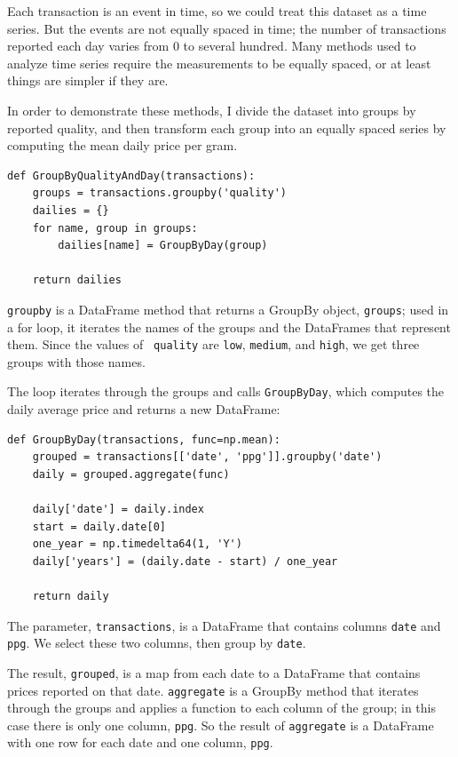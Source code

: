 \documentclass[12pt]{book}
\theoremstyle{exercise}
\begin{document}
Each transaction is an event in time, so we could treat this dataset
as a time series.  But the events are not equally spaced in time; the
number of transactions reported each day varies from 0 to several
hundred.  Many methods used to analyze time series require the
measurements to be equally spaced, or at least things are simpler if
they are.%
%

In order to demonstrate these methods, I divide the dataset
into groups by reported quality, and then transform each group into
an equally spaced series by computing the mean daily price per gram.

\begin{verbatim}
def GroupByQualityAndDay(transactions):
    groups = transactions.groupby('quality')
    dailies = {}
    for name, group in groups:
        dailies[name] = GroupByDay(group)        

    return dailies
\end{verbatim}

{\tt groupby} is a DataFrame method that returns a GroupBy object,
{\tt groups}; used in a for loop, it iterates the names of the groups
and the DataFrames that represent them.  Since the values of {\tt
  quality} are {\tt low}, {\tt medium}, and {\tt high}, we get three
groups with those names.%
%

The loop iterates through the groups and calls {\tt GroupByDay},
which computes the daily average price and returns a new DataFrame:

\begin{verbatim}
def GroupByDay(transactions, func=np.mean):
    grouped = transactions[['date', 'ppg']].groupby('date')
    daily = grouped.aggregate(func)

    daily['date'] = daily.index
    start = daily.date[0]
    one_year = np.timedelta64(1, 'Y')
    daily['years'] = (daily.date - start) / one_year

    return daily
\end{verbatim}

The parameter, {\tt transactions}, is a DataFrame that contains
columns {\tt date} and {\tt ppg}.  We select these two
columns, then group by {\tt date}.%

The result, {\tt grouped}, is a map from each date to a DataFrame that
contains prices reported on that date.  {\tt aggregate} is a
GroupBy method that iterates through the groups and applies a
function to each column of the group; in this case there is only one
column, {\tt ppg}.  So the result of {\tt aggregate} is a DataFrame
with one row for each date and one column, {\tt ppg}.%
\end{document}
